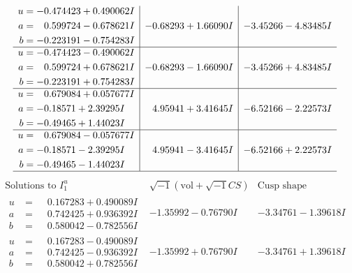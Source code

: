 \documentclass[1p]{elsarticle_modified}
\theoremstyle{definition}
\newcommand{\I}{\sqrt{-1}}
\begin{document}
$$\begin{array}{c|c|c}
\begin{aligned}
u &= -0.474423 + 0.490062 I \\
a &= \phantom{-}0.599724 - 0.678621 I \\
b &= -0.223191 - 0.754283 I\end{aligned}
 & -0.68293 + 1.66090 I & -3.45266 - 4.83485 I \\ \hline\begin{aligned}
u &= -0.474423 - 0.490062 I \\
a &= \phantom{-}0.599724 + 0.678621 I \\
b &= -0.223191 + 0.754283 I\end{aligned}
 & -0.68293 - 1.66090 I & -3.45266 + 4.83485 I \\ \hline\begin{aligned}
u &= \phantom{-}0.679084 + 0.057677 I \\
a &= -0.18571 + 2.39295 I \\
b &= -0.49465 + 1.44023 I\end{aligned}
 & \phantom{-}4.95941 + 3.41645 I & -6.52166 - 2.22573 I \\ \hline\begin{aligned}
u &= \phantom{-}0.679084 - 0.057677 I \\
a &= -0.18571 - 2.39295 I \\
b &= -0.49465 - 1.44023 I\end{aligned}
 & \phantom{-}4.95941 - 3.41645 I & -6.52166 + 2.22573 I\\
 \hline 
 \end{array}$$\newpage$$\begin{array}{c|c|c}  
\text{Solutions to }I^u_{1}& \I (\text{vol} + \sqrt{-1}CS) & \text{Cusp shape}\\
 \hline 
\begin{aligned}
u &= \phantom{-}0.167283 + 0.490089 I \\
a &= \phantom{-}0.742425 + 0.936392 I \\
b &= \phantom{-}0.580042 - 0.782556 I\end{aligned}
 & -1.35992 - 0.76790 I & -3.34761 - 1.39618 I \\ \hline\begin{aligned}
u &= \phantom{-}0.167283 - 0.490089 I \\
a &= \phantom{-}0.742425 - 0.936392 I \\
b &= \phantom{-}0.580042 + 0.782556 I\end{aligned}
 & -1.35992 + 0.76790 I & -3.34761 + 1.39618 I \\ \hline\begin{aligned}

\end{aligned}
\end{array}$$
\end{document}
